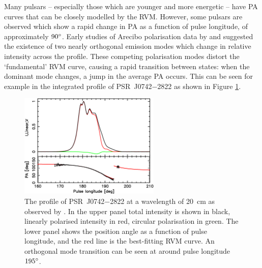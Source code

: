 Many pulsars -- especially those which are younger and more energetic -- have PA curves that can be closely modelled by the RVM. 
However, some pulsars are observed which show a rapid change in PA as a function of pulse longitude, of approximately $90^\circ$. 
Early studies of Arecibo polarisation data by \citet{RCBx1974} and \citet{BRCx1976} suggested the existence of two nearly orthogonal emission modes which change in relative intensity across the profile.
These competing polarisation modes distort the `fundamental' RVM curve, causing a rapid transition between states: when the dominant mode changes, a jump in the average PA occurs. This can be seen for example in the integrated profile of PSR~J0742$-$2822 as shown in Figure \ref{fig: intro - J0742 OPMs}.
\begin{figure}
    \begin{center}
        \includegraphics[width=0.6\textwidth]{Figures/Introduction/opm_profile}
        \caption[Orthogonal polarisation modes in PSR~J0742$-$2822]{The profile of PSR~J0742$-$2822 at a wavelength of 20~cm as observed by \citet{RWJx2015a}. In the upper panel total intensity is shown in black, linearly polarised intensity in red, circular polarisation in green. The lower panel shows the position angle as a function of pulse longitude, and the red line is the best-fitting RVM curve. An orthogonal mode transition can be seen at around pulse longitude $195^\circ$. }
        \label{fig: intro - J0742 OPMs}
    \end{center}
\end{figure}

